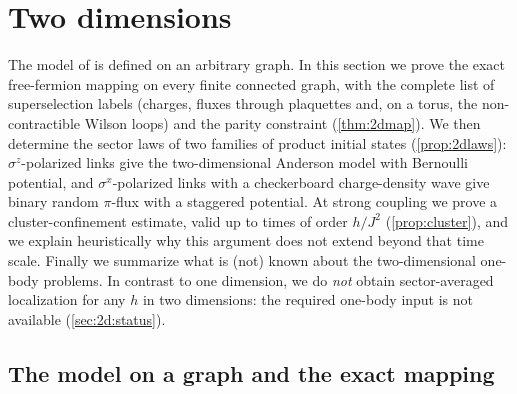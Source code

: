 \providecommand{\TLat}{\mathcal{L}}          %
\providecommand{\TCyc}{\mathcal{Z}}          %
\providecommand{\TFlux}{\Phi}                %
\providecommand{\TGauge}{\Theta}             %
\providecommand{\Tpi}{\pi}                   %
\providecommand{\Tclus}{\mathcal{C}}         %

\section{Two dimensions}\label{sec:2d}

The model of \cite{SKKM2018} is defined on an arbitrary graph.  In this section we prove the exact
free-fermion mapping on every finite connected graph, with the complete list of superselection labels
(charges, fluxes through plaquettes and, on a torus, the non-contractible Wilson loops) and the parity
constraint (\cref{thm:2dmap}).  We then determine the sector laws of two families of product initial
states (\cref{prop:2dlaws}): $\sigma^z$-polarized links give the two-dimensional Anderson model with
Bernoulli potential, and $\sigma^x$-polarized links with a checkerboard charge-density wave give binary
random $\pi$-flux with a staggered potential.  At strong coupling we prove a cluster-confinement estimate,
valid up to times of order $h/J^2$ (\cref{prop:cluster}), and we explain heuristically why this argument does not
extend beyond that time scale.
Finally we summarize what is (not) known about the two-dimensional one-body problems.  In contrast to one
dimension, we do \emph{not} obtain sector-averaged localization for any $h$ in two dimensions: the
required one-body input is not available (\cref{sec:2d:status}).

\subsection{The model on a graph and the exact mapping}\label{sec:2d:model}

